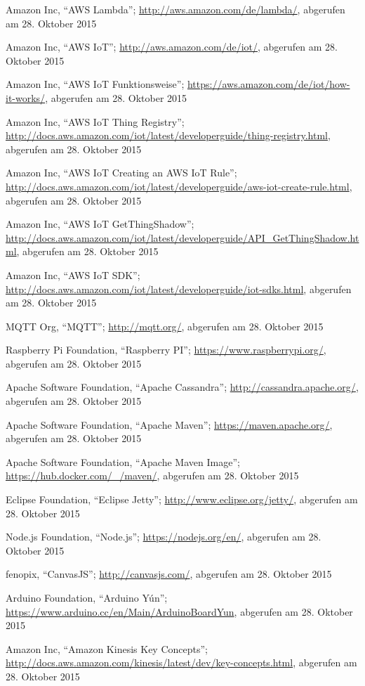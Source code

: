 \begin{thebibliography}{1}
Amazon Inc, ``AWS Lambda''; \url{http://aws.amazon.com/de/lambda/}, abgerufen am 28. Oktober 2015

Amazon Inc, ``AWS IoT''; \url{http://aws.amazon.com/de/iot/}, abgerufen am 28. Oktober 2015


Amazon Inc, ``AWS IoT Funktionsweise''; \url{https://aws.amazon.com/de/iot/how-it-works/}, abgerufen am 28. Oktober 2015

Amazon Inc, ``AWS IoT Thing Registry''; \url{http://docs.aws.amazon.com/iot/latest/developerguide/thing-registry.html}, abgerufen am 28. Oktober 2015

Amazon Inc, ``AWS IoT Creating an AWS IoT Rule''; \url{http://docs.aws.amazon.com/iot/latest/developerguide/aws-iot-create-rule.html}, abgerufen am 28. Oktober 2015

Amazon Inc, ``AWS IoT GetThingShadow''; \url{http://docs.aws.amazon.com/iot/latest/developerguide/API_GetThingShadow.html}, abgerufen am 28. Oktober 2015

Amazon Inc, ``AWS IoT SDK''; \url{http://docs.aws.amazon.com/iot/latest/developerguide/iot-sdks.html}, abgerufen am 28. Oktober 2015

MQTT Org, ``MQTT''; \url{http://mqtt.org/}, abgerufen am 28. Oktober 2015

Raspberry Pi Foundation, ``Raspberry PI''; \url{https://www.raspberrypi.org/}, abgerufen am 28. Oktober 2015

Apache Software Foundation, ``Apache Cassandra''; \url{http://cassandra.apache.org/}, abgerufen am 28. Oktober 2015

Apache Software Foundation, ``Apache Maven''; \url{https://maven.apache.org/}, abgerufen am 28. Oktober 2015

Apache Software Foundation, ``Apache Maven Image''; \url{https://hub.docker.com/_/maven/}, abgerufen am 28. Oktober 2015

Eclipse Foundation, ``Eclipse Jetty''; \url{http://www.eclipse.org/jetty/}, abgerufen am 28. Oktober 2015

Node.js Foundation, ``Node.js''; \url{https://nodejs.org/en/}, abgerufen am 28. Oktober 2015

fenopix, ``CanvasJS''; \url{http://canvasjs.com/}, abgerufen am 28. Oktober 2015

Arduino Foundation, ``Arduino Yún''; \url{https://www.arduino.cc/en/Main/ArduinoBoardYun}, abgerufen am 28. Oktober 2015

Amazon Inc, ``Amazon Kinesis Key Concepts'';  \url{http://docs.aws.amazon.com/kinesis/latest/dev/key-concepts.html}, abgerufen am 28. Oktober 2015

\end{thebibliography}